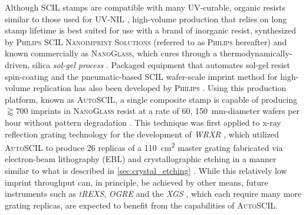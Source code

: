 Although SCIL stamps are compatible with many UV-curable, organic resists similar to those used for UV-NIL \cite{Ji10,Schift10}, high-volume production that relies on long stamp lifetime is best suited for use with a brand of inorganic resist, synthesized by \textsc{Philips SCIL Nanoimprint Solutions} \cite{philis_scil} (referred to as \textsc{Philips} hereafter) and known commercially as \textsc{NanoGlass}, which cures through a thermodynamically-driven, silica \emph{sol-gel process} \cite{Verschuuren10,Verschuuren17}. 
Packaged equipment that automates sol-gel resist spin-coating and the pneumatic-based SCIL wafer-scale imprint method for high-volume replication has also been developed by \textsc{Philips} \cite{philis_scil}. 
Using this production platform, known as \textsc{AutoSCIL}, a single composite stamp is capable of producing $\gtrapprox \num{700}$ imprints in \textsc{NanoGlass} resist at a rate of \num{60}, \SI{150}{\mm}-diameter wafers per hour without pattern degradation \cite{Verschuuren17,Verschuuren18,Verschuuren19}. 
This technique was first applied to x-ray reflection grating technology for the development of \emph{WRXR} \cite{Miles17,Miles18b,Tutt19}, which utilized \textsc{AutoSCIL} to produce \num{26} replicas of a \SI{110}{\cm\squared} master grating fabricated via electron-beam lithography (EBL) and crystallographic etching in a manner similar to what is described in \cref{sec:crystal_etching} \cite{Miles19,Verschuuren18}. 
While this relatively low imprint throughput can, in principle, be achieved by other means, future instruments such as \emph{tREXS}, \emph{OGRE} and the \emph{XGS} \cite{Miles19b,Tutt18,McEntaffer19}, which each require many more grating replicas, are expected to benefit from the capabilities of \textsc{AutoSCIL}. 

